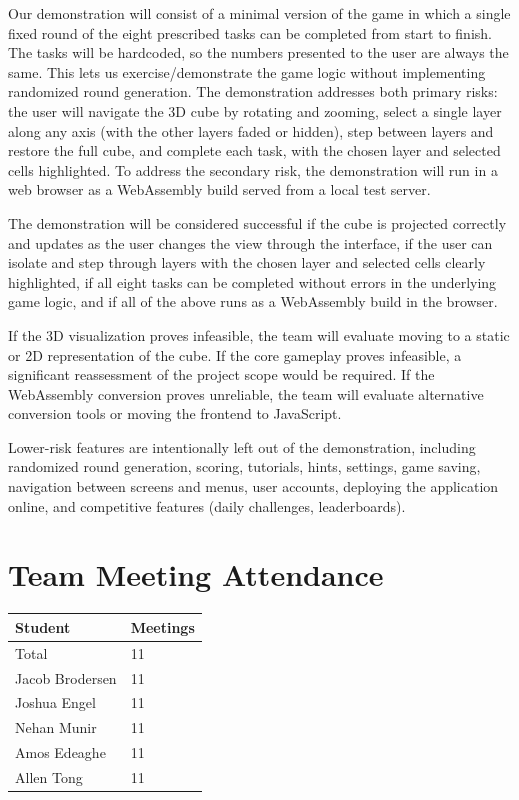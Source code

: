 \documentclass{article}
\begin{document}
Our demonstration will consist of a minimal version of the game in which a single
fixed round of the eight prescribed tasks can be completed from start to finish.
The tasks will be hardcoded, so the numbers presented to the user are always the
same. This lets us exercise/demonstrate the game logic without implementing randomized round
generation. The demonstration addresses both primary risks: the user will
navigate the 3D cube by rotating and zooming, select a single layer along any
axis (with the other layers faded or hidden), step between layers and restore
the full cube, and complete each task, with the chosen layer and selected cells
highlighted. To address the secondary risk, the
demonstration will run in a web browser as a WebAssembly build served from a
local test server.

The demonstration will be considered successful if the cube is projected
correctly and updates as the user changes the view through the interface, if
the user can isolate and step through layers with the chosen layer and selected
cells clearly highlighted, if all
eight tasks can be completed without errors in the underlying game logic, and if
all of the above runs as a WebAssembly build in the browser.

If the 3D visualization proves infeasible, the team will evaluate moving to a
static or 2D representation of the cube. If the core gameplay proves infeasible,
a significant reassessment of the project scope would be required. If the
WebAssembly conversion proves unreliable, the team will evaluate alternative
conversion tools or moving the frontend to JavaScript.

Lower-risk features are intentionally left out of the demonstration, including
randomized round generation, scoring, tutorials, hints, settings, game saving, navigation between screens and menus, user accounts, deploying
the application online, and competitive features (daily challenges,
leaderboards).

\section{Team Meeting Attendance}


\begin{table}[H]
\centering
\begin{tabular}{ll}
\toprule
\textbf{Student} & \textbf{Meetings}\\
\midrule
Total & 11\\
Jacob Brodersen & 11\\
Joshua Engel & 11\\
Nehan Munir & 11\\
Amos Edeaghe & 11\\
Allen Tong & 11\\
\bottomrule
\end{tabular}
\end{table}
\end{document}
